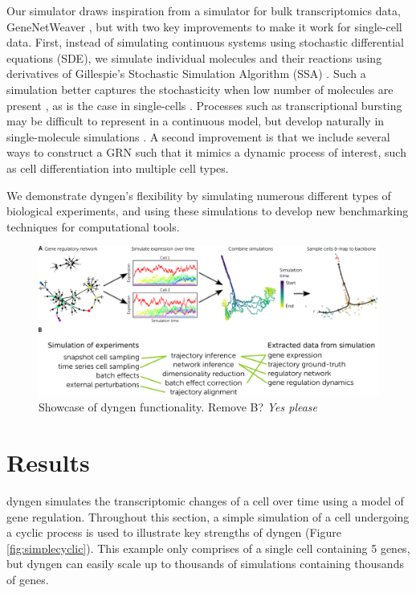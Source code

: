 Our simulator draws inspiration from a simulator for bulk transcriptomics data, GeneNetWeaver \cite{schaffter_genenetweaversilicobenchmark_2011,marbach_wisdomcrowdsrobust_2012}, but with two key improvements to make it work for single-cell data. First, instead of simulating continuous systems using stochastic differential equations (SDE), we simulate individual molecules and their reactions using derivatives of Gillespie's Stochastic Simulation Algorithm (SSA) \cite{gillespie_exactstochasticsimulation_1977}. Such a simulation better captures the stochasticity when low number of molecules are present  \cite{gillespie_exactstochasticsimulation_1977}, as is the case in single-cells \cite{zenklusen_singlernacountingreveals_2008}. Processes such as transcriptional bursting may be difficult to represent in a continuous model, but develop naturally in single-molecule simulations \cite{schuh_genenetworkstranscriptional_2019}. A second improvement is that we include several ways to construct a GRN such that it mimics a dynamic process of interest, such as cell differentiation into multiple cell types. 

We demonstrate dyngen's flexibility by simulating numerous different types of biological experiments, and using these simulations to develop new benchmarking techniques for computational tools.

\begin{figure}[htb!]
	\centering
	\includegraphics[width=\linewidth]{fig/showcase_4} 
	\caption{Showcase of dyngen functionality. Remove B? \textit{Yes please}} %
	\label{fig:dyngen}
\end{figure}

\section{Results}
dyngen simulates the transcriptomic changes of a cell over time using a model of gene regulation. Throughout this section, a simple simulation of a cell undergoing a cyclic process is used to illustrate key strengths of dyngen (Figure \ref{fig:simplecyclic}). This example only comprises of a single cell containing 5 genes, but dyngen can easily scale up to thousands of simulations containing thousands of genes.

